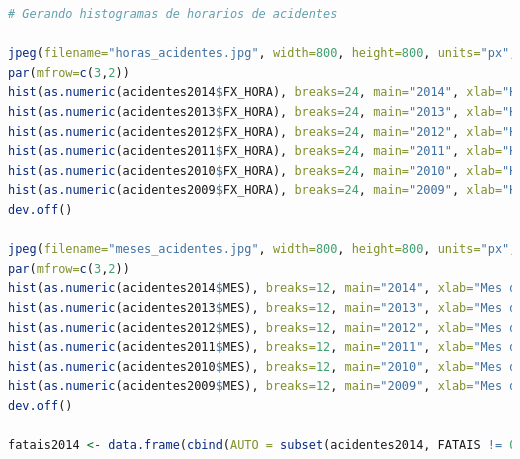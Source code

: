 \documentclass[11pt,article,oneside,a4paper]{abntex2}
\begin{document}
\begin{small}
\begin{lstlisting}[language=R,frame=shadowbox, breaklines=true, commentstyle=\textit]
# Gerando histogramas de horarios de acidentes

jpeg(filename="horas_acidentes.jpg", width=800, height=800, units="px", pointsize=12, quality=100, bg="white", res=NA);
par(mfrow=c(3,2))
hist(as.numeric(acidentes2014$FX_HORA), breaks=24, main="2014", xlab="Horario do acidente", ylab="Frequencia", col="yellow");
hist(as.numeric(acidentes2013$FX_HORA), breaks=24, main="2013", xlab="Horario do acidente", ylab="Frequencia", col="yellow");
hist(as.numeric(acidentes2012$FX_HORA), breaks=24, main="2012", xlab="Horario do acidente", ylab="Frequencia", col="yellow");
hist(as.numeric(acidentes2011$FX_HORA), breaks=24, main="2011", xlab="Horario do acidente", ylab="Frequencia", col="yellow");
hist(as.numeric(acidentes2010$FX_HORA), breaks=24, main="2010", xlab="Horario do acidente", ylab="Frequencia", col="yellow");
hist(as.numeric(acidentes2009$FX_HORA), breaks=24, main="2009", xlab="Horario do acidente", ylab="Frequencia", col="yellow");
dev.off()

jpeg(filename="meses_acidentes.jpg", width=800, height=800, units="px", pointsize=12, quality=100, bg="white", res=NA);
par(mfrow=c(3,2))
hist(as.numeric(acidentes2014$MES), breaks=12, main="2014", xlab="Mes do acidente", ylab="Frequencia", col="yellow");
hist(as.numeric(acidentes2013$MES), breaks=12, main="2013", xlab="Mes do acidente", ylab="Frequencia", col="yellow");
hist(as.numeric(acidentes2012$MES), breaks=12, main="2012", xlab="Mes do acidente", ylab="Frequencia", col="yellow");
hist(as.numeric(acidentes2011$MES), breaks=12, main="2011", xlab="Mes do acidente", ylab="Frequencia", col="yellow");
hist(as.numeric(acidentes2010$MES), breaks=12, main="2010", xlab="Mes do acidente", ylab="Frequencia", col="yellow");
hist(as.numeric(acidentes2009$MES), breaks=12, main="2009", xlab="Mes do acidente", ylab="Frequencia", col="yellow");
dev.off()

fatais2014 <- data.frame(cbind(AUTO = subset(acidentes2014, FATAIS != 0)$AUTO, TAXI = subset(acidentes2014, FATAIS != 0)$TAXI, LOTACAO = subset(acidentes2014, FATAIS != 0)$LOTACAO, ONIBUS_URB = subset(acidentes2014, FATAIS != 0)$ONIBUS_URB, ONIBUS_INT = subset(acidentes2014, FATAIS != 0)$ONIBUS_INT, CAMINHAO = subset(acidentes2014, FATAIS != 0)$CAMINHAO, MOTO = subset(acidentes2014, FATAIS != 0)$MOTO, CARROCA = subset(acidentes2014, FATAIS != 0)$CARROCA, BICICLETA = subset(acidentes2014, FATAIS != 0)$BICICLETA, OUTRO = subset(acidentes2014, FATAIS != 0)$OUTRO, FATAIS = subset(acidentes2014, FATAIS != 0)$FATAIS, MORTES = subset(acidentes2014, FATAIS != 0)$MORTES, MORTE_POST = subset(acidentes2014, FATAIS != 0)$MORTE_POST, FERIDOS = subset(acidentes2014, FATAIS != 0)$FERIDOS))


\end{lstlisting}
\end{small}
\end{document}
